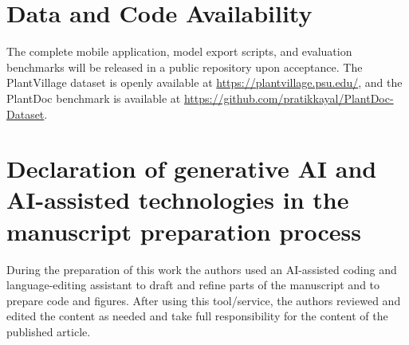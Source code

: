 \documentclass[preprint,12pt]{elsarticle}
\begin{document}
\section*{Data and Code Availability}
The complete mobile application, model export scripts, and evaluation benchmarks will be released in a public repository upon acceptance. The PlantVillage dataset is openly available at \url{https://plantvillage.psu.edu/}, and the PlantDoc benchmark is available at \url{https://github.com/pratikkayal/PlantDoc-Dataset}.

\section*{Declaration of generative AI and AI-assisted technologies in the manuscript preparation process}
During the preparation of this work the authors used an AI-assisted coding and language-editing assistant to draft and refine parts of the manuscript and to prepare code and figures. After using this tool/service, the authors reviewed and edited the content as needed and take full responsibility for the content of the published article.



\end{document}
